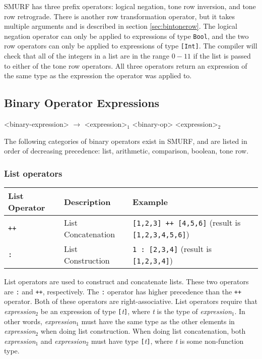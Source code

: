 SMURF has three prefix operators: logical negation, tone row inversion, and tone row retrograde.
There is another row transformation operator, but it takes multiple arguments and is described in
section \ref{sec:bintonerow}. The logical negation operator can only be applied to expressions of
type \texttt{Bool}, and the two row operators can only be applied to expressions of type
\texttt{[Int]}. The compiler will check that all of the integers in a list are in the range $0-11$
if the list is passed to either of the tone row operators.
All three operators return an expression of the same type as the expression the
operator was applied to.

\subsection{Binary Operator Expressions}
\label{sec:binaryop}
\begin{grammar}
<binary-expression> $\rightarrow$ <expression>$_1$ <binary-op> <expression>$_2$
\end{grammar}
The following categories of binary operators exist in SMURF, and are listed in order of decreasing
precedence: list, arithmetic, comparison, boolean, tone row. 

\subsubsection{List operators}

\begin{table} [H]
\centering
\begin{tabular}{lll}
\hline\hline
List Operator & Description & Example \\
\hline\hline
   \texttt{++} & List Concatenation & \texttt{[1,2,3] ++ [4,5,6]} (result is \texttt{[1,2,3,4,5,6]}) \\ \hline
   \texttt{:} & List Construction & \texttt{1 : [2,3,4]} (result is \texttt{[1,2,3,4]}) \\ \hline
\end{tabular}
\end{table}

List operators are used to construct and concatenate lists. 
These two operators are \texttt{:} and \texttt{++}, respectively. The \texttt{:} operator has 
higher precedence than the \texttt{++} operator. Both of these operators are right-associative.
List operators require that  \emph{expression$_{2}$} be an expression of type 
\texttt{[}\emph{t}\texttt{]}, where \emph{t} is the type of \emph{expression$_{1}$}. 
In other words, \emph{expression$_{1}$} must have the same type 
as the other elements in \emph{expression$_{2}$} when doing list construction.
When doing list concatenation, both
\emph{expression$_{1}$} and \emph{expression$_{2}$} must have type \texttt{[}\emph{t}\texttt{]},
where \emph{t} is some non-function type. 

